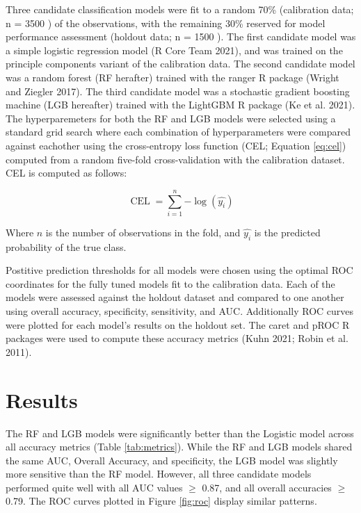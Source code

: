 \documentclass[]{elsarticle} %
\begin{document}
Three candidate classification models were fit to a random 70\%
(calibration data; n =
3500
)
of the observations, with the remaining 30\% reserved for model performance
assessment (holdout data; n =
1500
).
The first candidate model was a simple logistic regression model (R Core Team 2021),
and was trained on the principle components variant of the calibration data.
The second candidate model was a random forest (RF herafter) trained with
the ranger R package (Wright and Ziegler 2017).
The third candidate model was a stochastic gradient boosting machine
(LGB hereafter) trained with the LightGBM R package (Ke et al. 2021).
The hyperparemeters for both the RF and LGB models were selected using a
standard grid search where each combination of hyperparameters were compared
against eachother using the cross-entropy loss function
(CEL; Equation \eqref{eq:cel})
computed from a random five-fold cross-validation with the calibration dataset.
CEL is computed as follows:

\begin{equation}
\operatorname{CEL} = \sum_{i=1}^{n}{-\log{(\hat{y_{i}})}} \label{eq:cel}
\end{equation}

Where \(n\) is the number of observations in the fold, and \(\hat{y_i}\) is
the predicted probability of the true class.

Postitive prediction thresholds for all models were chosen using the optimal
ROC coordinates for the fully tuned models fit to the calibration data.
Each of the models were assessed against the holdout dataset and compared to one
another using overall accuracy, specificity, sensitivity, and AUC.
Additionally ROC curves were plotted for each model's results on the holdout
set.
The caret and pROC R packages were used to compute these accuracy metrics
(Kuhn 2021; Robin et al. 2011).

\hypertarget{results}{%
\section{Results}\label{results}}

The RF and LGB models were significantly better than the Logistic model
across all accuracy metrics (Table \ref{tab:metrics}).
While the RF and LGB models shared the same AUC, Overall Accuracy, and
specificity, the LGB model was slightly more sensitive than the RF model.
However, all three candidate models performed quite well with
all AUC values \(\geq\) 0.87, and all overall accuracies \(\geq\) 0.79.
The ROC curves plotted in Figure \ref{fig:roc} display similar patterns.
\end{document}
